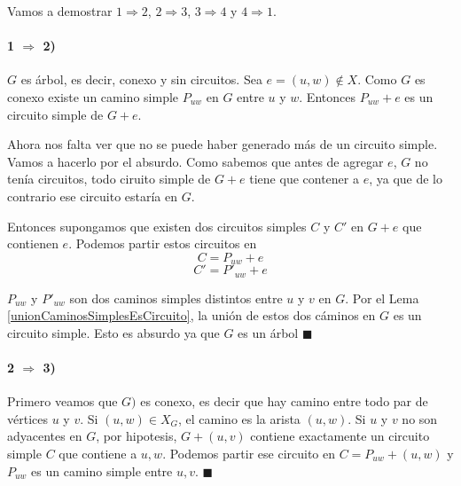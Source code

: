 \begin{demo}
	Vamos a demostrar \(1\Rightarrow 2\), \(2 \Rightarrow 3\), \(3 \Rightarrow 4\) y \(4 \Rightarrow 1\).

\paragraph{1 \(\Rightarrow\) 2)} \(G\) es árbol, es decir, conexo y sin circuitos. Sea \(e=(u,w)\notin X\). Como \(G\) es conexo existe un camino simple \(P_{uw}\) en \(G\) entre \(u\) y \(w\). Entonces \(P_{uw} + e\) es un circuito simple de \(G + e\).
	
	Ahora nos falta ver que no se puede haber generado más de un circuito simple. Vamos a hacerlo por el absurdo. Como sabemos que antes de agregar \(e\), \(G\) no tenía circuitos, todo ciruito simple de \(G + e\) tiene que contener a \(e\), ya que de lo contrario ese circuito estaría en \(G\).
	
	Entonces supongamos que existen dos circuitos simples \(C\) y \(C'\) en \(G + e\) que contienen \(e\). Podemos partir estos circuitos en \[ C = P_{uw} + e\] \[C'	= P'_{uw} + e\]
	
	\(P_{uw}\) y \(P'_{uw}\) son dos caminos simples distintos entre \(u\) y \(v\) en \(G\). Por el Lema \ref{unionCaminosSimplesEsCircuito}, la unión de estos dos cáminos en \(G\) es un circuito simple. Esto es absurdo ya que \(G\) es un árbol \(\blacksquare\)

	\paragraph{2 \(\Rightarrow\) 3)} Primero veamos que \(G)\) es conexo, es decir que hay camino entre todo par de vértices \(u\) y \(v\). Si \((u,w)\in X_G\), el camino es la arista \((u,w)\). Si \(u\) y \(v\) no son adyacentes en \(G\), por hipotesis, \(G+(u,v)\) contiene exactamente un circuito simple \(C\) que contiene a \(u,w\). Podemos partir ese circuito en \(C = P_{uw} + (u,w)\) y \(P_{uw}\) es un camino simple entre \(u,v\). \(\blacksquare\)
\end{demo}
